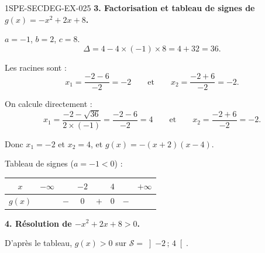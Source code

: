 \begin{corrige}{1SPE-SECDEG-EX-025}
\medskip
\textbf{3. Factorisation et tableau de signes de $g(x) = -x^2 + 2x + 8$.}


$a = -1$, $b = 2$, $c = 8$.
\[\Delta = 4 - 4 \times (-1) \times 8 = 4 + 32 = 36.\]

Les racines sont :
\[x_1 = \frac{-2 - 6}{-2} = -2 \qquad \text{et} \qquad x_2 = \frac{-2 + 6}{-2} = -2.\]

On calcule directement :
\[x_1 = \frac{-2 - \sqrt{36}}{2 \times (-1)} = \frac{-2 - 6}{-2} = 4 \qquad \text{et} \qquad x_2 = \frac{-2 + 6}{-2} = -2.\]

Donc $x_1 = -2$ et $x_2 = 4$, et $g(x) = -(x + 2)(x - 4)$.

Tableau de signes ($a = -1 < 0$) :

\medskip
\begin{center}
\begin{tabular}{|c|ccccccc|}
\hline
$x$ & $-\infty$ & & $-2$ & & $4$ & & $+\infty$ \\
\hline
$g(x)$ & & $-$ & $0$ & $+$ & $0$ & $-$ & \\
\hline
\end{tabular}
\end{center}

\medskip
\textbf{4. Résolution de $-x^2 + 2x + 8 > 0$.}


D'après le tableau, $g(x) > 0$ sur $\mathcal{S} = \left]-2\,;\,4\right[$.

\end{corrige}
